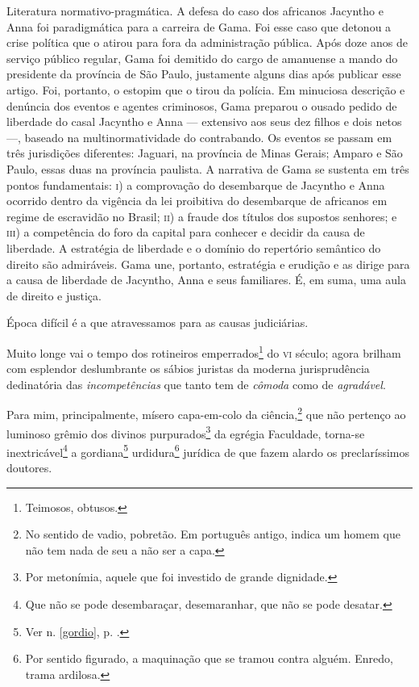 \begin{didascalia}
Literatura normativo-pragmática. A defesa do caso dos africanos Jacyntho
e Anna foi paradigmática para a carreira de Gama. Foi esse caso que
detonou a crise política que o atirou para fora da administração
pública. Após doze anos de serviço público regular, Gama foi demitido do
cargo de amanuense a mando do presidente da província de São Paulo,
justamente alguns dias após publicar esse artigo. Foi, portanto, o
estopim que o tirou da polícia. Em minuciosa descrição e denúncia dos
eventos e agentes criminosos, Gama preparou o ousado pedido de liberdade
do casal Jacyntho e Anna --- extensivo aos seus dez filhos e dois netos
---, baseado na multinormatividade do contrabando. Os eventos se passam
em três jurisdições diferentes: Jaguari, na província de Minas Gerais;
Amparo e São Paulo, essas duas na província paulista. A narrativa de
Gama se sustenta em três pontos fundamentais: \textsc{i}) a comprovação do
desembarque de Jacyntho e Anna ocorrido dentro da vigência da lei
proibitiva do desembarque de africanos em regime de escravidão no
Brasil; \textsc{ii}) a fraude dos títulos dos supostos senhores; e \textsc{iii}) a
competência do foro da capital para conhecer e decidir da causa de
liberdade. A estratégia de liberdade e o domínio do repertório semântico
do direito são admiráveis. Gama une, portanto, estratégia e erudição e
as dirige para a causa de liberdade de Jacyntho, Anna e seus familiares.
É, em suma, uma aula de direito e justiça.
\end{didascalia}



Época difícil é a que atravessamos para as causas judiciárias.

Muito longe vai o tempo dos rotineiros emperrados\footnote{Teimosos,
  obtusos.} do \textsc{vi} século; agora brilham com esplendor deslumbrante os
sábios juristas da moderna jurisprudência dedinatória das
\emph{incompetências} que tanto tem de \emph{cômoda} como de
\emph{agradável}.

Para mim, principalmente, mísero capa-em-colo da ciência,\footnote{No
  sentido de vadio, pobretão. Em português antigo, indica um homem que
  não tem nada de seu a não ser a capa.} que não pertenço ao luminoso
grêmio dos divinos purpurados\footnote{Por metonímia, aquele que foi
  investido de grande dignidade.} da egrégia Faculdade, torna-se
inextricável\footnote{Que não se pode desembaraçar, desemaranhar, que
  não se pode desatar.} a gordiana\footnote{Ver n. \ref{gordio}, p. \pageref{gordio}.}
urdidura\footnote{Por sentido figurado, a maquinação que se tramou
  contra alguém. Enredo, trama ardilosa.} jurídica de que fazem alardo
os preclaríssimos doutores.

